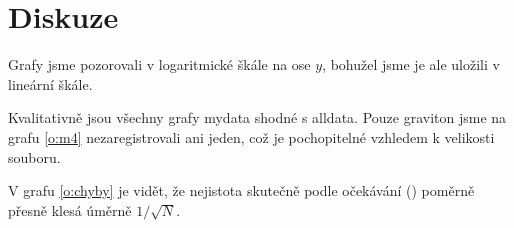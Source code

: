 \section*{Diskuze}
Grafy jsme pozorovali v logaritmické škále na ose $y$, bohužel jsme je ale uložili v lineární škále.

Kvalitativně jsou všechny grafy mydata shodné s alldata. Pouze graviton jsme na grafu \ref{o:m4} nezaregistrovali ani jeden, což je pochopitelné vzhledem k velikosti souboru.

V grafu \ref{o:chyby} je vidět, že nejistota skutečně podle očekávání (\cite{skripta}) poměrně přesně klesá úměrně $1/\sqrt{N}$.
